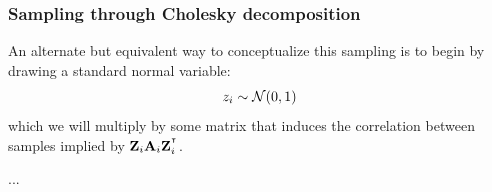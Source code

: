\documentclass[12pt]{article}
\begin{document}
\subsubsection{Sampling through Cholesky decomposition}
An alternate but equivalent way to conceptualize this sampling is to begin by drawing a standard normal variable:
$$ z_i \sim \mathcal{N}(0,1) $$
which we will multiply by some matrix that induces the correlation between samples implied by $\mathbf{Z}_i \mathbf{A}_i \mathbf{Z}_i^{^\intercal}$.

...



\end{document}
